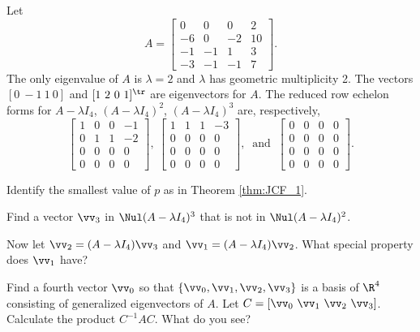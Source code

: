\begin{activity} \label{act:JCF_3} Let 
\[A = \left[ \begin{array}{rrrc} 0&0&0&2 \\ -6&0&-2&10 \\ -1&-1&1&3 \\ -3&-1&-1&7 \end{array} \right].\]
The only eigenvalue of $A$ is $\lambda = 2$ and $\lambda$ has geometric multiplicity 2. The vectors $[0 \ -1 \ 1 \ 0]$ and $[1 \ 2\ 0 \  1]^{\tr}$ are eigenvectors for $A$. The reduced row echelon forms for $A - \lambda I_4$,  $(A - \lambda I_4)^2$, $(A - \lambda I_4)^3$ are, respectively, 
\[\left[ \begin{array}{cccr} 1&0&0&-1 \\ 0&1&1&-2 \\ 0&0&0&0 \\ 0&0&0&0 \end{array} \right], \ \left[ \begin{array}{cccr} 1&1&1&-3 \\ 0&0&0&0 \\ 0&0&0&0 \\ 0&0&0&0 \end{array} \right], \ \text{ and } \ \left[ \begin{array}{cccc} 0&0&0&0 \\ 0&0&0&0 \\ 0&0&0&0 \\ 0&0&0&0 \end{array} \right].\]
	\ba
	\item Identify the smallest value of $p$ as in Theorem \ref{thm:JCF_1}.
	
	\item Find a vector $\vv_3$ in $\Nul (A - \lambda I_4)^3$ that is not in $\Nul (A - \lambda I_4)^2$.	

	\item Now let $\vv_2 = (A-\lambda I_4) \vv_3$ and $\vv_1 = (A-\lambda I_4) \vv_2$. What special property does $\vv_1$ have?
	
	\item Find a fourth vector $\vv_0$ so that $\{\vv_0, \vv_1, \vv_2, \vv_3\}$ is a basis of $\R^4$ consisting of generalized eigenvectors of $A$. Let $C = [\vv_0 \ \vv_1 \ \vv_2 \ \vv_3]$. Calculate the product $C^{-1}AC$. What do you see?  
	
	\ea
	
\end{activity}

